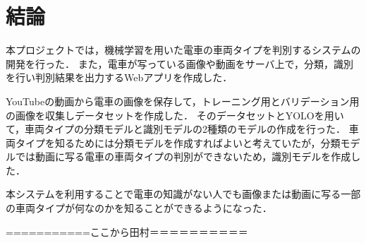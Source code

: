 

\chapter{結論}\label{conclusion}
本プロジェクトでは，機械学習を用いた電車の車両タイプを判別するシステムの開発を行った．
また，電車が写っている画像や動画をサーバ上で，分類，識別を行い判別結果を出力するWebアプリを作成した．

YouTubeの動画から電車の画像を保存して，トレーニング用とバリデーション用の画像を収集しデータセットを作成した．
そのデータセットとYOLOを用いて，車両タイプの分類モデルと識別モデルの2種類のモデルの作成を行った．
車両タイプを知るためには分類モデルを作成すればよいと考えていたが，分類モデルでは動画に写る電車の車両タイプの判別ができないため，識別モデルを作成した．

本システムを利用することで電車の知識がない人でも画像または動画に写る一部の車両タイプが何なのかを知ることができるようになった．


===========ここから田村＝＝＝＝＝＝＝＝＝＝